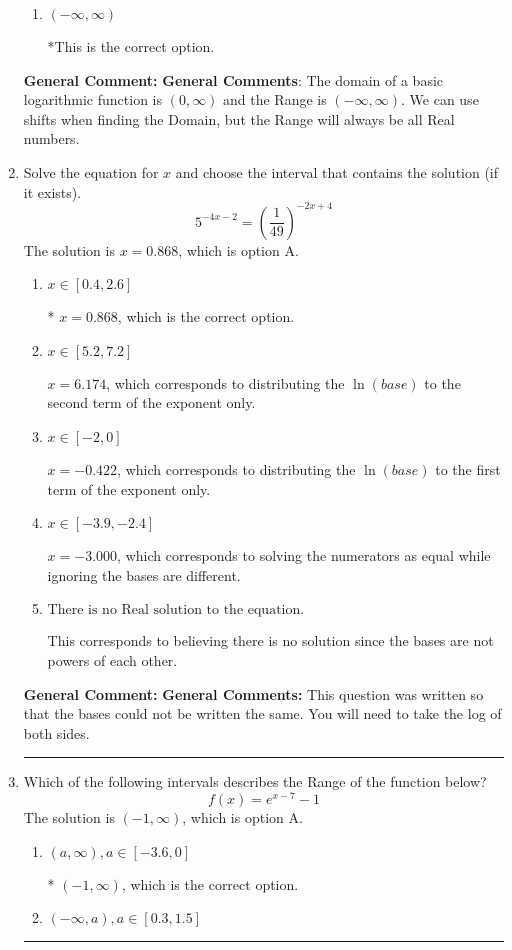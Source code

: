 \documentclass{extbook}[14pt]
\newcommand{\litem}[1]{\item #1

\rule{\textwidth}{0.4pt}}
\begin{document}
\begin{enumerate}
{\begin{enumerate}[label=\Alph*.]
$[6, \infty)$, which corresponds to using the negative of the horizontal shift AND including the endpoint.
\item \( (-\infty, \infty) \)

*This is the correct option.
\end{enumerate}

\textbf{General Comment:} \textbf{General Comments}: The domain of a basic logarithmic function is $(0, \infty)$ and the Range is $(-\infty, \infty)$. We can use shifts when finding the Domain, but the Range will always be all Real numbers.
}
\litem{
Solve the equation for $x$ and choose the interval that contains the solution (if it exists).
\[ 5^{-4x-2} = \left(\frac{1}{49}\right)^{-2x+4} \]The solution is \( x = 0.868 \), which is option A.\begin{enumerate}[label=\Alph*.]
\item \( x \in [0.4, 2.6] \)

* $x = 0.868$, which is the correct option.
\item \( x \in [5.2, 7.2] \)

$x = 6.174$, which corresponds to distributing the $\ln(base)$ to the second term of the exponent only.
\item \( x \in [-2, 0] \)

$x = -0.422$, which corresponds to distributing the $\ln(base)$ to the first term of the exponent only.
\item \( x \in [-3.9, -2.4] \)

$x = -3.000$, which corresponds to solving the numerators as equal while ignoring the bases are different.
\item \( \text{There is no Real solution to the equation.} \)

This corresponds to believing there is no solution since the bases are not powers of each other.
\end{enumerate}

\textbf{General Comment:} \textbf{General Comments:} This question was written so that the bases could not be written the same. You will need to take the log of both sides.
}
\litem{
Which of the following intervals describes the Range of the function below?
\[ f(x) = e^{x-7}-1 \]The solution is \( (-1, \infty) \), which is option A.\begin{enumerate}[label=\Alph*.]
\item \( (a, \infty), a \in [-3.6, 0] \)

* $(-1, \infty)$, which is the correct option.
\item \( (-\infty, a), a \in [0.3, 1.5] \)


\end{enumerate}}
\end{enumerate}
\end{document}

